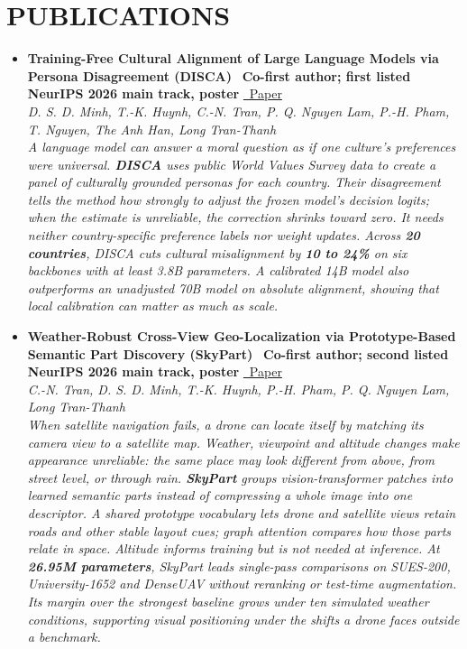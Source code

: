 \documentclass[10pt,a4paper]{article}
\begin{document}
\section*{PUBLICATIONS}
{\small
\begin{itemize}[label={},labelwidth=0pt,labelsep=0pt, itemsep=5pt]
    \item \textbf{Training-Free Cultural Alignment of Large Language Models via Persona Disagreement (DISCA)} \quad \faStar\ \textbf{Co-first author; first listed}\\[1pt]
    \textbf{NeurIPS 2026 main track, poster} \quad \href{https://arxiv.org/pdf/2605.10843v2}{\faFilePdf\ Paper}\\[1pt]
    \textit{D. S. D. Minh, T.-K. Huynh, C.-N. Tran, P. Q. Nguyen Lam, P.-H. Pham, T. Nguyen, The Anh Han, Long Tran-Thanh}\\[2pt]
    \textit{A language model can answer a moral question as if one culture's preferences were universal. \textbf{DISCA} uses public World Values Survey data to create a panel of culturally grounded personas for each country. Their disagreement tells the method how strongly to adjust the frozen model's decision logits; when the estimate is unreliable, the correction shrinks toward zero. It needs neither country-specific preference labels nor weight updates. Across \textbf{20 countries}, DISCA cuts cultural misalignment by \textbf{10 to 24\%} on six backbones with at least 3.8B parameters. A calibrated 14B model also outperforms an unadjusted 70B model on absolute alignment, showing that local calibration can matter as much as scale.}
    \item \textbf{Weather-Robust Cross-View Geo-Localization via Prototype-Based Semantic Part Discovery (SkyPart)} \quad \faStar\ \textbf{Co-first author; second listed}\\[1pt]
    \textbf{NeurIPS 2026 main track, poster} \quad \href{https://arxiv.org/pdf/2605.11654v2}{\faFilePdf\ Paper}\\[1pt]
    \textit{C.-N. Tran, D. S. D. Minh, T.-K. Huynh, P.-H. Pham, P. Q. Nguyen Lam, Long Tran-Thanh}\\[2pt]
    \textit{When satellite navigation fails, a drone can locate itself by matching its camera view to a satellite map. Weather, viewpoint and altitude changes make appearance unreliable: the same place may look different from above, from street level, or through rain. \textbf{SkyPart} groups vision-transformer patches into learned semantic parts instead of compressing a whole image into one descriptor. A shared prototype vocabulary lets drone and satellite views retain roads and other stable layout cues; graph attention compares how those parts relate in space. Altitude informs training but is not needed at inference. At \textbf{26.95M parameters}, SkyPart leads single-pass comparisons on SUES-200, University-1652 and DenseUAV without reranking or test-time augmentation. Its margin over the strongest baseline grows under ten simulated weather conditions, supporting visual positioning under the shifts a drone faces outside a benchmark.}

\end{itemize}}
\end{document}

